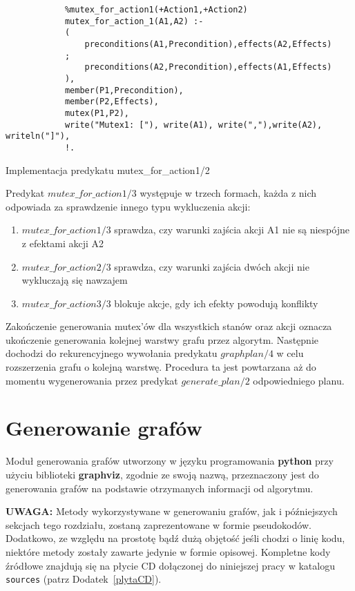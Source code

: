     \begin{listing}[H]
        \begin{verbatim}
            %mutex_for_action1(+Action1,+Action2)
            mutex_for_action_1(A1,A2) :-
            ( 
                preconditions(A1,Precondition),effects(A2,Effects)
            ;
                preconditions(A2,Precondition),effects(A1,Effects)
            ),
            member(P1,Precondition),
            member(P2,Effects),
            mutex(P1,P2),
            write("Mutex1: ["), write(A1), write(","),write(A2), writeln("]"),
            !.
    \end{verbatim}
    \caption{Implementacja predykatu mutex\_for\_action1/2}
    \end{listing}
    
    Predykat $mutex\_for\_action1/3$ występuje w trzech formach, każda z nich odpowiada za sprawdzenie innego typu wykluczenia akcji:
    \begin{enumerate}
        \item $mutex\_for\_action1/3$ sprawdza, czy warunki zajścia akcji A1 nie są niespójne z efektami akcji A2 
        \item $mutex\_for\_action2/3$ sprawdza, czy warunki zajścia dwóch akcji nie wykluczają się nawzajem
        \item $mutex\_for\_action3/3$ blokuje akcje, gdy ich efekty powodują konflikty
    \end{enumerate}

    Zakończenie generowania mutex'ów dla wszystkich stanów oraz akcji oznacza ukończenie generowania kolejnej warstwy grafu przez algorytm. 
    Następnie dochodzi do rekurencyjnego wywołania predykatu $graphplan/4$ w celu rozszerzenia grafu o kolejną warstwę. Procedura ta 
    jest powtarzana aż do momentu wygenerowania przez predykat $generate\_plan/2$ odpowiedniego planu.


\section{Generowanie grafów}
    Moduł generowania grafów utworzony w języku programowania \textbf{python} przy użyciu biblioteki \textbf{graphviz}, zgodnie ze swoją nazwą,
    przeznaczony jest do generowania grafów na podstawie otrzymanych informacji od algorytmu.

    \textbf{UWAGA:} Metody wykorzystywane w generowaniu grafów, jak i późniejszych sekcjach tego rozdziału, zostaną zaprezentowane w formie pseudokodów.
    Dodatkowo, ze względu na prostotę bądź dużą objętość jeśli chodzi o linię kodu, niektóre metody zostały zawarte jedynie w formie opisowej.  
    Kompletne kody źródłowe znajdują się na płycie CD dołączonej do niniejszej pracy w katalogu \texttt{sources} (patrz Dodatek~\ref{plytaCD}).
